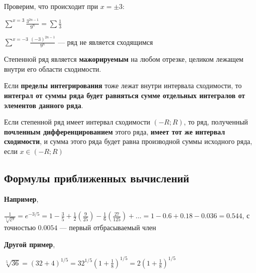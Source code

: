 \documentclass{article}
\begin{document}
Проверим, что происходит при $x = \pm 3$:

$\sum\limits^{x = 3} \frac{3^{2 n - 1}}{9^{n}} = \sum \frac{1}{3}$

$\sum\limits^{x = -3} \frac{(-3)^{2 n - 1}}{9^{n}}$ — ряд не является сходящимся

\hfill

Степенной ряд является \textbf{мажорируемым} на любом отрезке, целиком лежащем внутри его области сходимости.

\hfill

Если \textbf{пределы интегрирования} тоже лежат внутри интервала сходимости, то \textbf{интеграл от суммы ряда будет равняться сумме отдельных интегралов от элементов данного ряда}.

\hfill

Если степенной ряд имеет интервал сходимости $(-R; R)$, то ряд, полученный \textbf{почленным дифференцированием} этого ряда, \textbf{имеет тот же интервал сходимости}, и сумма этого ряда будет равна производной суммы исходного ряда, если $x \in (-R; R)$

\subsection{Формулы приближенных вычислений}

\begin{multienumerate}
\end{multienumerate}

\textbf{Например},

$\frac{1}{\sqrt[5]{e^3}} = e^{-3/5} = 1 - \frac{3}{5} + \frac{1}{2} (\frac{9}{25}) - \frac{1}{6} (\frac{27}{125}) + \dots = 1 - 0.6 + 0.18 - 0.036 = 0.544$, с точностью $0.0054$ — первый отбрасываемый член

\hfill

\textbf{Другой пример},

$\sqrt[5]{36} = (32 + 4)^{1/5} = 32^{1/5} (1 + \frac{1}{8})^{1/5} = 2 (1 + \frac{1}{8})^{1/5}$
\end{document}
